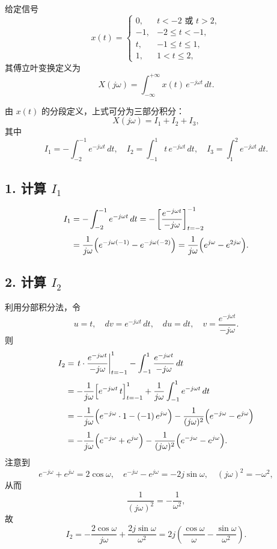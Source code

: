 \documentclass[11pt]{article}
\begin{document}
    \begin{center}
    \end{center}
    { \hspace*{\fill} \\}
    
    给定信号 \[
x(t)=
\begin{cases}
0, & t < -2 \text{ 或 } t > 2,\\[1mm]
-1, & -2 \le t < -1,\\[1mm]
t, & -1 \le t \le 1,\\[1mm]
1, & 1 < t \le 2,
\end{cases}
\] 其傅立叶变换定义为 \[
X(j\omega)=\int_{-\infty}^{+\infty} x(t) \, e^{-j\omega t}\,dt.
\]

由 \(x(t)\) 的分段定义，上式可分为三部分积分： \[
X(j\omega)=I_1+I_2+I_3,
\] 其中 \[
I_1=-\int_{-2}^{-1} e^{-j\omega t}\,dt,\quad
I_2=\int_{-1}^{1} t\, e^{-j\omega t}\,dt,\quad
I_3=\int_{1}^{2} e^{-j\omega t}\,dt.
\]

\subsection{\texorpdfstring{1. 计算
\(I_1\)}{1. 计算 I\_1}}\label{ux8ba1ux7b97-i_1}

\[
\begin{aligned}
I_1 &=-\int_{-2}^{-1} e^{-j\omega t}\,dt
=-\left[\frac{e^{-j\omega t}}{-j\omega}\right]_{t=-2}^{-1}\\[1mm]
&=\frac{1}{j\omega}\Bigl(e^{-j\omega(-1)}-e^{-j\omega(-2)}\Bigr)
=\frac{1}{j\omega}\Bigl(e^{j\omega}-e^{2j\omega}\Bigr).
\end{aligned}
\]

\subsection{\texorpdfstring{2. 计算
\(I_2\)}{2. 计算 I\_2}}\label{ux8ba1ux7b97-i_2}

利用分部积分法，令 \[
u=t,\quad dv=e^{-j\omega t}\,dt,\quad du=dt,\quad v=\frac{e^{-j\omega t}}{-j\omega}.
\] 则 \[
\begin{aligned}
I_2 &= \left. t\cdot \frac{e^{-j\omega t}}{-j\omega} \right|_{t=-1}^{1} - \int_{-1}^{1}\frac{e^{-j\omega t}}{-j\omega}\,dt\\[1mm]
&=-\frac{1}{j\omega}\Bigl[e^{-j\omega t}\,t\Bigr]_{t=-1}^{1} + \frac{1}{j\omega}\int_{-1}^{1}e^{-j\omega t}\,dt\\[1mm]
&=-\frac{1}{j\omega}\Bigl(e^{-j\omega}\cdot 1 - (-1)\,e^{j\omega}\Bigr)
-\frac{1}{(j\omega)^2}\Bigl(e^{-j\omega}-e^{j\omega}\Bigr)\\[1mm]
&=-\frac{1}{j\omega}\Bigl(e^{-j\omega}+e^{j\omega}\Bigr)
-\frac{1}{(j\omega)^2}\Bigl(e^{-j\omega}-e^{j\omega}\Bigr).
\end{aligned}
\] 注意到 \[
e^{-j\omega}+e^{j\omega}=2\cos\omega,\quad e^{-j\omega}-e^{j\omega}=-2j\sin\omega,\quad (j\omega)^2=-\omega^2,
\] 从而 \[
\frac{1}{(j\omega)^2}=-\frac{1}{\omega^2},
\] 故 \[
I_2=-\frac{2\cos\omega}{j\omega}+\frac{2j\sin\omega}{\omega^2}
=2j\left(\frac{\cos\omega}{\omega}-\frac{\sin\omega}{\omega^2}\right).
\]
\end{document}
